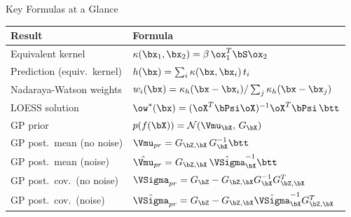 \begin{frame}{Key Formulas at a Glance}{}
  \begin{center}
    \small
    \renewcommand{\arraystretch}{1.45}
    \begin{tabular}{ll}
      \hline\hline
      \textbf{Result} & \textbf{Formula} \\
      \hline
      Equivalent kernel & $\kappa(\bx_1,\bx_2)=\beta\,\ox_1^T\bS\ox_2$ \\
      Prediction (equiv.\ kernel) & $h(\bx)=\sum_i\kappa(\bx,\bx_i)\,t_i$ \\
      Nadaraya-Watson weights & $w_i(\bx)=\kappa_h(\bx-\bx_i)/\sum_j\kappa_h(\bx-\bx_j)$ \\
      LOESS solution & $\ow^*(\bx)=(\oX^T\bPsi\oX)^{-1}\oX^T\bPsi\,\btt$ \\
      GP prior & $p(f(\bX))=\mathcal{N}(\Vmu_{\bX},\,G_{\bX})$ \\
      GP post.\ mean (no noise) & $\Vmu_{pr}=G_{\bZ,\bX}\,G_{\bX}^{-1}\btt$ \\
      GP post.\ mean (noise) & $\hat{\Vmu}_{pr}=G_{\bZ,\bX}\,\hat{\VSigma}_{\bX}^{-1}\btt$ \\
      GP post.\ cov.\ (no noise) & $\VSigma_{pr}=G_{\bZ}-G_{\bZ,\bX}G_{\bX}^{-1}G_{\bZ,\bX}^T$ \\
      GP post.\ cov.\ (noise) & $\hat{\VSigma}_{pr}=G_{\bZ}-G_{\bZ,\bX}\hat{\VSigma}_{\bX}^{-1}G_{\bZ,\bX}^T$ \\
      \hline\hline
    \end{tabular}
  \end{center}
\end{frame}

%

